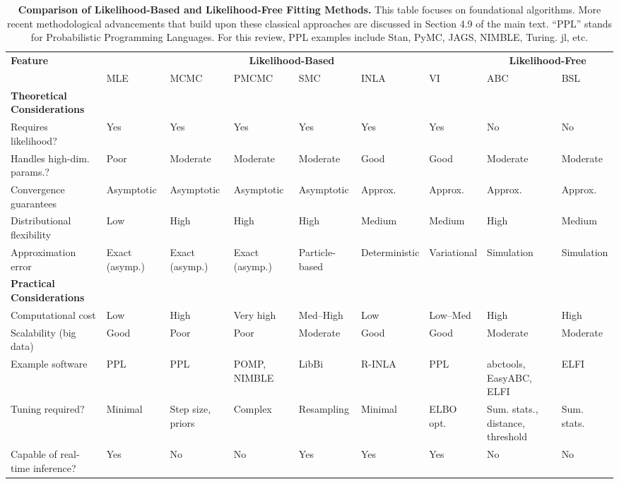 \documentclass{article}
\begin{document}
\begin{landscape}
\begin{table}[ht]
\renewcommand{\arraystretch}{1.2}
\centering
\caption{\textbf{Comparison of Likelihood-Based and Likelihood-Free Fitting Methods.} 
This table focuses on foundational algorithms. More recent methodological advancements that build upon these classical approaches are discussed in Section 4.9 of the main text. ``PPL'' stands for Probabilistic Programming Languages. For this review, PPL examples include Stan, PyMC, JAGS, NIMBLE, Turing. jl, etc.}
\label{tab:methods_comparison}
\small
\begin{tabular}{@{}p{3.2cm}p{1.5cm}p{1.5cm}p{1.5cm}p{1.5cm}p{1.5cm}p{1.5cm}p{1.5cm}p{1.5cm}@{}}
\toprule
\multirow{2}{*}{\textbf{Feature}} & \multicolumn{6}{c}{\textbf{Likelihood-Based}} & \multicolumn{2}{c}{\textbf{Likelihood-Free}} \\
\cmidrule(lr){2-7} \cmidrule(lr){8-9}
 & MLE & MCMC & PMCMC & SMC & INLA & VI & ABC & BSL \\
\midrule
\textbf{Theoretical Considerations} & & & & & & & & \\
\midrule
Requires likelihood? & Yes & Yes & Yes & Yes & Yes & Yes & No & No \\
Handles high-dim. params.? & Poor & Moderate & Moderate & Moderate & Good & Good & Moderate & Moderate \\
Convergence guarantees & Asymptotic & Asymptotic & Asymptotic & Asymptotic & Approx. & Approx. & Approx. & Approx. \\
Distributional flexibility & Low & High & High & High & Medium & Medium & High & Medium \\
Approximation error & Exact (asymp.) & Exact (asymp.) & Exact (asymp.) & Particle-based & Deterministic & Variational & Simulation & Simulation \\
\midrule
\textbf{Practical Considerations} & & & & & & & & \\
\midrule
Computational cost & Low & High & Very high & Med--High & Low & Low--Med & High & High \\
Scalability (big data) & Good & Poor & Poor & Moderate & Good & Good & Moderate & Moderate \\
Example software & PPL & PPL & POMP, NIMBLE & LibBi & R-INLA & PPL &abctools, EasyABC, ELFI & ELFI \\
Tuning required? & Minimal & Step size, priors & Complex & Resampling & Minimal & ELBO opt. & Sum. stats., distance, threshold & Sum. stats. \\
Capable of real-time inference? & Yes & No & No & Yes & Yes & Yes & No & No \\

\end{tabular}
\end{table}
\end{landscape}
\end{document}
